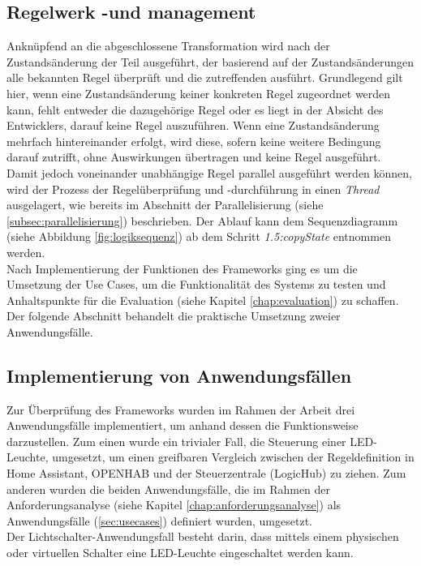 \subsection{Regelwerk -und management}
    Anknüpfend an die abgeschlossene Transformation wird nach der Zustandsänderung der Teil ausgeführt, der basierend auf der Zustandsänderungen 
    alle bekannten Regel überprüft und die zutreffenden ausführt. Grundlegend gilt hier, wenn eine Zustandsänderung keiner konkreten Regel zugeordnet 
    werden kann, fehlt entweder die dazugehörige Regel oder es liegt in der Absicht des Entwicklers, darauf keine Regel auszuführen. Wenn eine 
    Zustandsänderung mehrfach hintereinander erfolgt, wird diese, sofern keine weitere Bedingung darauf zutrifft, ohne Auswirkungen übertragen 
    und keine Regel ausgeführt. Damit jedoch voneinander unabhängige Regel parallel ausgeführt werden können, wird der Prozess der Regelüberprüfung und -durchführung 
    in einen \textit{Thread} ausgelagert, wie bereits im Abschnitt der Parallelisierung (siehe \ref{subsec:parallelisierung}) beschrieben. Der Ablauf kann dem 
    Sequenzdiagramm (siehe Abbildung \ref{fig:logiksequenz}) ab dem Schritt \textit{1.5:copyState} entnommen werden. 
    \\
    \linebreak
    Nach Implementierung der Funktionen des Frameworks ging es um die Umsetzung der Use Cases, um die Funktionalität des Systems zu testen 
    und Anhaltspunkte für die Evaluation (siehe Kapitel \ref{chap:evaluation}) zu schaffen. Der folgende Abschnitt behandelt die praktische 
    Umsetzung zweier Anwendungsfälle. 

\subsection{Implementierung von Anwendungsfällen}
    Zur Überprüfung des Frameworks wurden im Rahmen der Arbeit drei Anwendungsfälle implementiert, um anhand dessen die Funktionsweise 
    darzustellen. Zum einen wurde ein trivialer Fall, die Steuerung einer LED-Leuchte, umgesetzt, um einen greifbaren Vergleich zwischen der 
    Regeldefinition in Home Assistant, \acs{OPENHAB} und der Steuerzentrale (LogicHub) zu ziehen. Zum anderen wurden die beiden 
    Anwendungsfälle, die im Rahmen der Anforderungsanalyse (siehe Kapitel \ref{chap:anforderungsanalyse}) als Anwendungsfälle (\ref{sec:usecases}) definiert wurden, umgesetzt. 
    \\
    \linebreak
    Der Lichtschalter-Anwendungsfall besteht darin, dass mittels einem physischen oder virtuellen Schalter eine LED-Leuchte eingeschaltet werden kann.   
    
    

